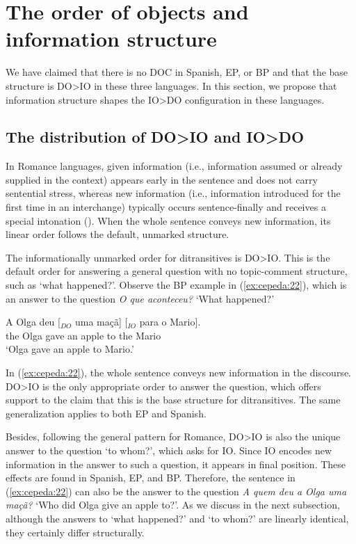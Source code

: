 \documentclass[output=paper,colorlinks,citecolor=brown]{./langscibook}
\begin{document}
\section{The order of objects and information structure}\label{sec:cepeda:3}

We have claimed that there is no DOC in Spanish, EP, or BP and that the base structure is DO>IO in these three languages. In this section, we propose that information structure shapes the IO>DO configuration in these languages.

\subsection{The distribution of DO>IO and IO>DO}\label{sec:cepeda:3.1}

In Romance languages, given information (i.e., information assumed or already supplied in the context) appears early in the sentence and does not carry sentential stress, whereas new information (i.e., information introduced for the first time in an interchange) typically occurs sentence-finally and receives a special intonation (\citealt{Zubizarreta1998}). When the whole sentence conveys new information, its linear order follows the default, unmarked structure.

The informationally unmarked order for ditransitives is DO>IO. This is the default order for answering a general question with no topic-comment structure, such as ‘what happened?’. Observe the BP example in (\ref{ex:cepeda:22}), which is an answer to the question \textit{O que aconteceu?} ‘What happened?’

\ea%
    \label{ex:cepeda:22}
	\gll A   Olga deu [$_{DO}$ uma maçã] [$_{IO}$ para o   Mario].\\
		the Olga gave \hspaceThis{[$_{DO}$} an apple \hspaceThis{[$_{IO}$} to the Mario\\
	\glt ‘Olga gave an apple to Mario.’
\z

In (\ref{ex:cepeda:22}), the whole sentence conveys new information in the discourse. DO>IO is the only appropriate order to answer the question, which offers support to the claim that this is the base structure for ditransitives. The same generalization applies to both EP and Spanish.

Besides, following the general pattern for Romance, DO>IO is also the unique answer to the question ‘to whom?’, which asks for IO. Since IO encodes new information in the answer to such a question, it appears in final position. These effects are found in Spanish, EP, and BP. Therefore, the sentence in (\ref{ex:cepeda:22}) can also be the answer to the question \textit{A quem deu a Olga uma maçã?} ‘Who did Olga give an apple to?’. As we discuss in the next subsection, although the answers to ‘what happened?’ and ‘to whom?’ are linearly identical, they certainly differ structurally.
\end{document}
